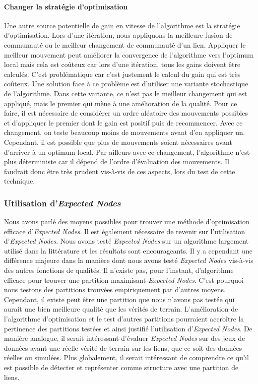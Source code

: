 \paragraph{Changer la stratégie d'optimisation}
Une autre source potentielle de gain en vitesse de l'algorithme est la stratégie d'optimisation.
Lors d'une itération, nous appliquons la meilleure fusion de communauté ou le meilleur changement de communauté d'un lien.
Appliquer le meilleur mouvement peut améliorer la convergence de l'algorithme vers l'optimum local mais cela est coûteux car lors d'une itération, tous les gains doivent être calculés.
C'est problématique car c'est justement le calcul du gain qui est très coûteux.
Une solution face à ce problème est d'utiliser une variante stochastique de l'algorithme.
Dans cette variante, ce n'est pas le meilleur changement qui est appliqué, mais le premier qui mène à une amélioration de la qualité.
Pour ce faire, il est nécessaire de considérer un ordre aléatoire des mouvements possibles et d'appliquer le premier dont le gain est positif puis de recommencer.
Avec ce changement, on teste beaucoup moins de mouvements avant d'en appliquer un.
Cependant, il est possible que plus de mouvements soient nécessaires avant d'arriver à un optimum local.
Par ailleurs avec ce changement, l'algorithme n'est plus déterministe car il dépend de l'ordre d'évaluation des mouvements.
Il faudrait donc être très prudent vis-à-vis de ces aspects, lors du test de cette technique.

\subsubsection{Utilisation d'\emph{Expected Nodes}}
Nous avons parlé des moyens possibles pour trouver une méthode d'optimisation efficace d'\emph{Expected Nodes}.
Il est également nécessaire de revenir sur l'utilisation d'\emph{Expected Nodes}.
Nous avons testé \emph{Expected Nodes} sur un algorithme largement utilisé dans la littérature et les résultats sont encourageants.
Il y a cependant une différence majeure dans la manière dont nous avons testé \emph{Expected Nodes} vis-à-vis des autres fonctions de qualités.
Il n'existe pas, pour l'instant, d'algorithme efficace pour trouver une partition maximisant \emph{Expected Nodes}.
C'est pourquoi nous testons des partitions trouvées empiriquement par d'autres moyens.
Cependant, il existe peut être une partition que nous n'avons pas testée qui aurait une bien meilleure qualité que les vérités de terrain.
L'amélioration de l'algorithme d'optimisation et le test d'autres partitions pourraient accroître la pertinence des partitions testées et ainsi justifié l'utilisation d'\emph{Expected Nodes}.
De manière analogue, il serait intéressant d'évaluer \emph{Expected Nodes} sur des jeux de données ayant une réelle vérité de terrain sur les liens, que ce soit des données réelles ou simulées.
Plus globalement, il serait intéressant de comprendre ce qu'il est possible de détecter et représenter comme structure avec une partition de liens.

